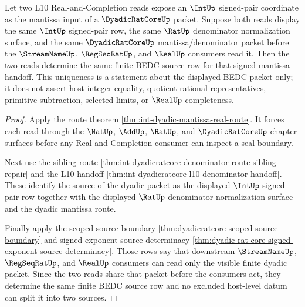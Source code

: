 \begin{theorem}
\label{thm:int-dyadic-mantissa-l10-source-uniqueness}
Let two L10 Real-and-Completion reads expose an $\IntUp$ signed-pair coordinate
as the mantissa input of a $\DyadicRatCoreUp$ packet. Suppose both reads display
the same $\IntUp$ signed-pair row, the same $\RatUp$ denominator normalization
surface, and the same $\DyadicRatCoreUp$ mantissa/denominator packet before the
$\StreamNameUp$, $\RegSeqRatUp$, and $\RealUp$ consumers read it. Then the two
reads determine the same finite BEDC source row for that signed mantissa
handoff. This uniqueness is a statement about the displayed BEDC packet only;
it does not assert host integer equality, quotient rational representatives,
primitive subtraction, selected limits, or $\RealUp$ completeness.
\end{theorem}
\begin{proof}
Apply the route theorem \autoref{thm:int-dyadic-mantissa-real-route}. It forces
each read through the $\NatUp$, $\AddUp$, $\RatUp$, and $\DyadicRatCoreUp$
chapter surfaces before any Real-and-Completion consumer can inspect a seal
boundary.

Next use the sibling route
\autoref{thm:int-dyadicratcore-denominator-route-sibling-repair} and the L10
handoff \autoref{thm:int-dyadicratcore-l10-denominator-handoff}. These identify
the source of the dyadic packet as the displayed $\IntUp$ signed-pair row
together with the displayed $\RatUp$ denominator normalization surface and the
dyadic mantissa route.

Finally apply the scoped source boundary
\autoref{thm:dyadicratcore-scoped-source-boundary} and signed-exponent source
determinacy \autoref{thm:dyadic-rat-core-signed-exponent-source-determinacy}.
Those rows say that downstream $\StreamNameUp$, $\RegSeqRatUp$, and $\RealUp$
consumers can read only the visible finite dyadic packet. Since the two reads
share that packet before the consumers act, they determine the same finite BEDC
source row and no excluded host-level datum can split it into two sources.
\end{proof}
